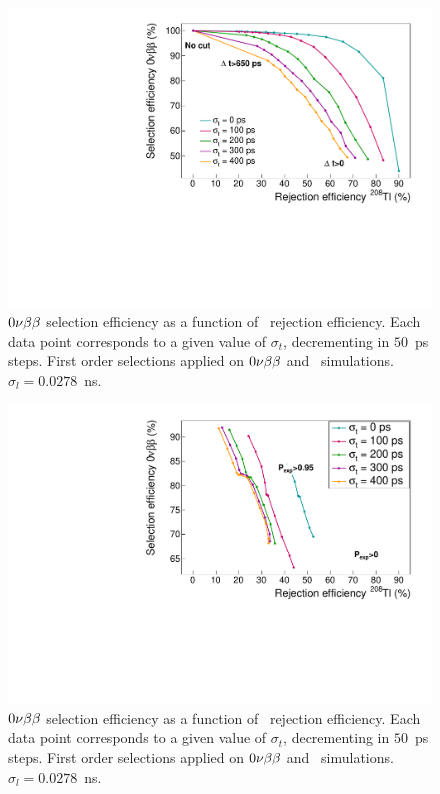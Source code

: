\begin{figure}
  \centering
  \includegraphics[width=13cm]{timedifference/fig_timediff/compare_sigma_cut_delta_t.pdf}
  \caption{$0\nu\beta\beta$ selection efficiency as a function of \Tl\ rejection efficiency.
    Each data point corresponds to a given value of $\sigma_{t}$, decrementing in $50$~ps steps.
    First order selections applied on $0\nu\beta\beta$ and \Tl\ simulations.
    $\sigma_{l}=0.0278$~ns.
    \label{fig:eff_cut_delta_t_sigma}}
\end{figure}

\begin{figure}
  \centering
  \includegraphics[width=13cm]{timedifference/fig_timediff/compare_sigma_cut_proba.pdf}
  \caption{$0\nu\beta\beta$ selection efficiency as a function of \Tl\ rejection efficiency.
    Each data point corresponds to a given value of $\sigma_{t}$, decrementing in $50$~ps steps.
    First order selections applied on $0\nu\beta\beta$ and \Tl\ simulations.
    $\sigma_{l}=0.0278$~ns.
    \label{fig:eff_cut_proba_sigma}}
\end{figure}

